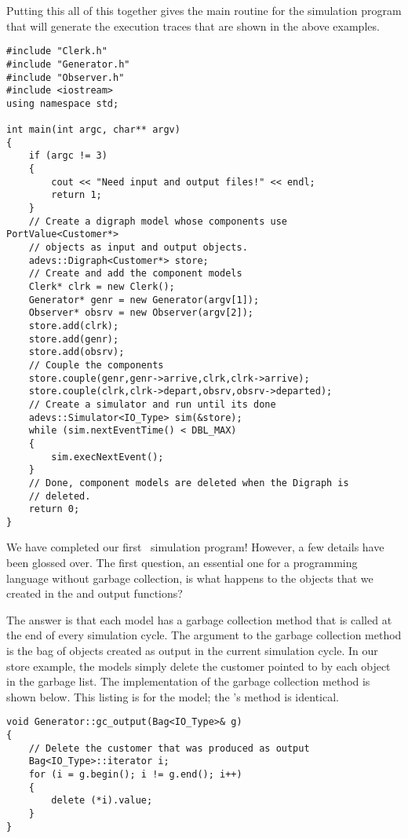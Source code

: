 Putting this all of this together gives the main routine for the simulation
program that will generate the execution traces that are shown in the
above examples.
\begin{verbatim}
#include "Clerk.h"
#include "Generator.h"
#include "Observer.h"
#include <iostream>
using namespace std;

int main(int argc, char** argv)
{
    if (argc != 3)
    {
        cout << "Need input and output files!" << endl;
        return 1;
    }
    // Create a digraph model whose components use PortValue<Customer*>
    // objects as input and output objects.
    adevs::Digraph<Customer*> store;
    // Create and add the component models
    Clerk* clrk = new Clerk();
    Generator* genr = new Generator(argv[1]);
    Observer* obsrv = new Observer(argv[2]);
    store.add(clrk);
    store.add(genr);
    store.add(obsrv);
    // Couple the components
    store.couple(genr,genr->arrive,clrk,clrk->arrive);
    store.couple(clrk,clrk->depart,obsrv,obsrv->departed);
    // Create a simulator and run until its done
    adevs::Simulator<IO_Type> sim(&store);
    while (sim.nextEventTime() < DBL_MAX)
    {
        sim.execNextEvent();
    }
    // Done, component models are deleted when the Digraph is
    // deleted.
    return 0;
}
\end{verbatim}

We have completed our first \adevs\ simulation program! However, a few
details have been glossed over. The first question, an
essential one for a programming language without garbage collection,
is what happens to the objects that we created in the  and  output functions?

The answer is that each model has a
garbage collection method that is called at the end of every
simulation cycle. The argument to the garbage collection method is
the bag of objects created as output in the current
simulation cycle. In our store example, the  models simply
delete the customer pointed to by each  object in the
garbage list. The implementation of the garbage collection method is
shown below. This listing is for the  model; the 's
 method is identical.
\begin{verbatim}
void Generator::gc_output(Bag<IO_Type>& g)
{
    // Delete the customer that was produced as output
    Bag<IO_Type>::iterator i;
    for (i = g.begin(); i != g.end(); i++)
    {
        delete (*i).value;
    }
}
\end{verbatim}


